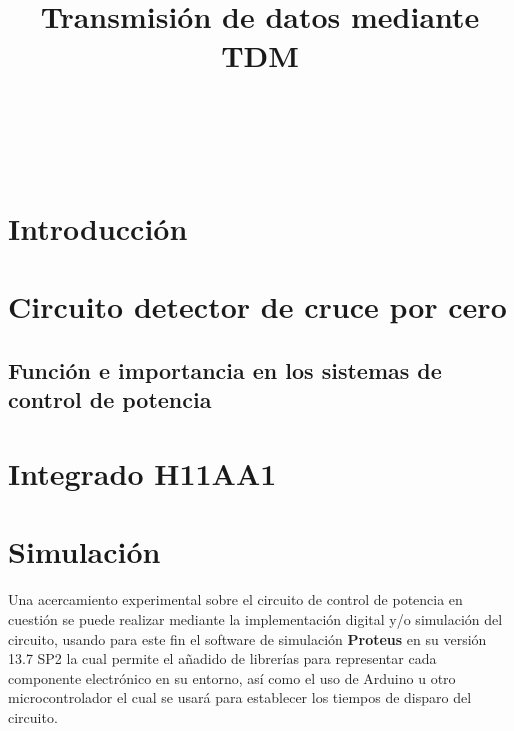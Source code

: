 \documentclass[conference]{IEEEtran}
\begin{document}
	
	\title{Transmisión de datos mediante TDM}
	\author{
		\\
		\\
		\\
		\and
		\and
	}
	
	\maketitle
	\begin{abstract}
		
	\end{abstract}
	\begin{IEEEkeywords}
		
	\end{IEEEkeywords}
	
	\section{Introducción}
	\section{\textbf{Circuito detector de cruce por cero}}
	\subsection{\textbf{Función e importancia en los sistemas de control de potencia}}
	\section{Integrado H11AA1}
	\section{\textbf{Simulación}}
	
	Una acercamiento experimental sobre el circuito de control de potencia en cuestión se puede realizar mediante la implementación digital y/o simulación del circuito, usando para este fin el software de simulación \textbf{Proteus} en su versión 13.7 SP2 la cual permite el añadido de librerías para representar cada componente electrónico en su entorno, así como el uso de Arduino u otro microcontrolador el cual se usará para establecer los tiempos de disparo del circuito.
	
\end{document}
